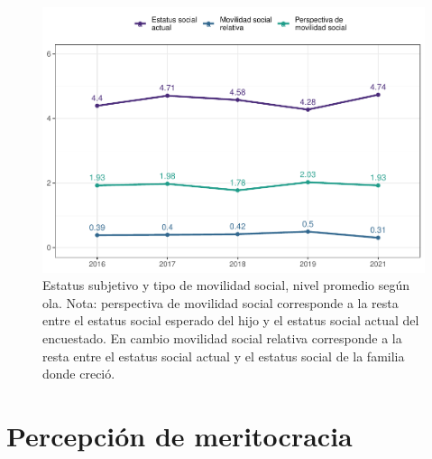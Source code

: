 \documentclass[
  12pt,
]{book}
\begin{document}
\begin{figure}

{\centering \includegraphics{reporte-elsoc_files/figure-latex/mov-soc-1} 

}

\caption{Estatus subjetivo y tipo de movilidad social, nivel promedio según ola.
Nota: perspectiva de movilidad social corresponde a la resta entre el estatus social esperado del hijo y el estatus social actual del encuestado. En cambio movilidad social relativa corresponde a la resta entre el estatus social actual y el estatus social de la familia donde creció.}\label{fig:mov-soc}
\end{figure}

\hypertarget{percepciuxf3n-de-meritocracia}{%
\section{Percepción de meritocracia}\label{percepciuxf3n-de-meritocracia}}
\end{document}
